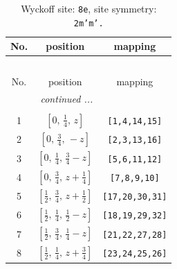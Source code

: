 \documentclass[fleqn,8pt]{jsarticle}
\begin{document}
\begin{longtable}{ccc}
\caption{Wyckoff site: {\tt 8e}, site symmetry: {\tt 2m'm'.}}
 \\
 \hline \hline
No. & position & mapping \\ \hline \endfirsthead

\multicolumn{2}{l}{\tablename\ \thetable{}} \\
 \hline \hline
No. & position & mapping \\ \hline \endhead

 \hline \hline
\multicolumn{2}{r}{\footnotesize\it continued ...} \\ \endfoot

 \hline \hline
\multicolumn{2}{r}{} \\ \endlastfoot

1 & $\left[ 0,\, \frac{1}{4},\, z \right]$ & {\tt [1,4,14,15]} \\ \hline
2 & $\left[ 0,\, \frac{3}{4},\, - z \right]$ & {\tt [2,3,13,16]} \\ \hline
3 & $\left[ 0,\, \frac{1}{4},\, \frac{3}{4} - z \right]$ & {\tt [5,6,11,12]} \\ \hline
4 & $\left[ 0,\, \frac{3}{4},\, z + \frac{1}{4} \right]$ & {\tt [7,8,9,10]} \\ \hline
5 & $\left[ \frac{1}{2},\, \frac{3}{4},\, z + \frac{1}{2} \right]$ & {\tt [17,20,30,31]} \\ \hline
6 & $\left[ \frac{1}{2},\, \frac{1}{4},\, \frac{1}{2} - z \right]$ & {\tt [18,19,29,32]} \\ \hline
7 & $\left[ \frac{1}{2},\, \frac{3}{4},\, \frac{1}{4} - z \right]$ & {\tt [21,22,27,28]} \\ \hline
8 & $\left[ \frac{1}{2},\, \frac{1}{4},\, z + \frac{3}{4} \right]$ & {\tt [23,24,25,26]} \\
\end{longtable}
\renewcommand{\arraystretch}{1.2}
\end{document}

